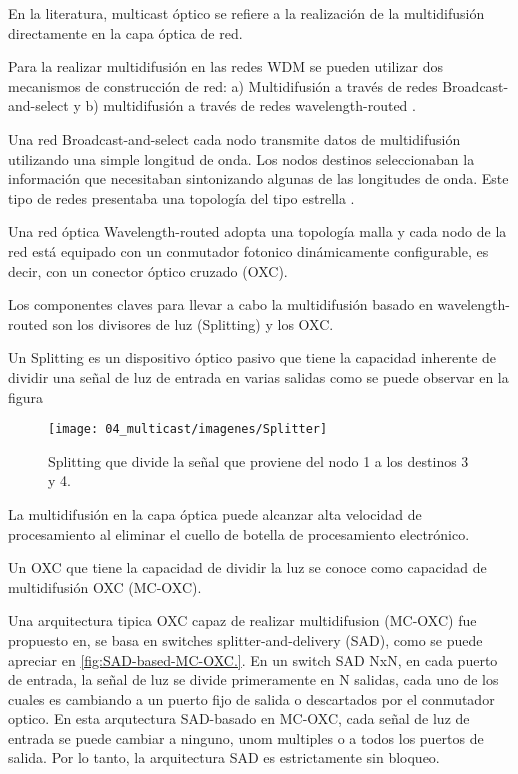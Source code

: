 En la literatura, multicast óptico se refiere a la realización de
la multidifusión directamente en la capa óptica de red.

Para la realizar multidifusión en las redes WDM se pueden utilizar
dos mecanismos de construcción de red: a) Multidifusión a través de
redes Broadcast-and-select y b) multidifusión a través de redes wavelength-routed
\cite{zhou2005optical}.

Una red Broadcast-and-select cada nodo transmite datos de multidifusión
utilizando una simple longitud de onda. Los nodos destinos seleccionaban
la información que necesitaban sintonizando algunas de las longitudes
de onda. Este tipo de redes presentaba una topología del tipo estrella
\cite{diegopinto2011}.

Una red óptica Wavelength-routed adopta una topología malla y cada
nodo de la red está equipado con un conmutador fotonico dinámicamente
configurable, es decir, con un conector óptico cruzado (OXC).

Los componentes claves para llevar a cabo la multidifusión basado
en wavelength-routed son los divisores de luz (Splitting) y los OXC. 

Un Splitting es un dispositivo óptico pasivo que tiene la capacidad
inherente de dividir una señal de luz de entrada en varias salidas
como se puede observar en la figura 

\begin{figure}[H]
\texttt{[image: 04\_multicast/imagenes/Splitter]}\caption{Splitting que divide la señal que proviene del nodo 1 a los destinos
3 y 4. \label{fig:Splitting-que-divide}}
\end{figure}


La multidifusión en la capa óptica puede alcanzar alta velocidad de
procesamiento al eliminar el cuello de botella de procesamiento electrónico.

Un OXC que tiene la capacidad de dividir la luz se conoce como capacidad
de multidifusión OXC (MC-OXC). 

Una arquitectura tipica OXC capaz de realizar multidifusion (MC-OXC)
fue propuesto en\cite{hu1998multicasting}, se basa en switches splitter-and-delivery
(SAD), como se puede apreciar en \ref{fig:SAD-based-MC-OXC.}. En
un switch SAD NxN, en cada puerto de entrada, la señal de luz se divide
primeramente en N salidas, cada uno de los cuales es cambiando a un
puerto fijo de salida o descartados por el conmutador optico. En esta
arqutectura SAD-basado en MC-OXC, cada señal de luz de entrada se
puede cambiar a ninguno, unom multiples o a todos los puertos de salida.
Por lo tanto, la arquitectura SAD es estrictamente sin bloqueo.



